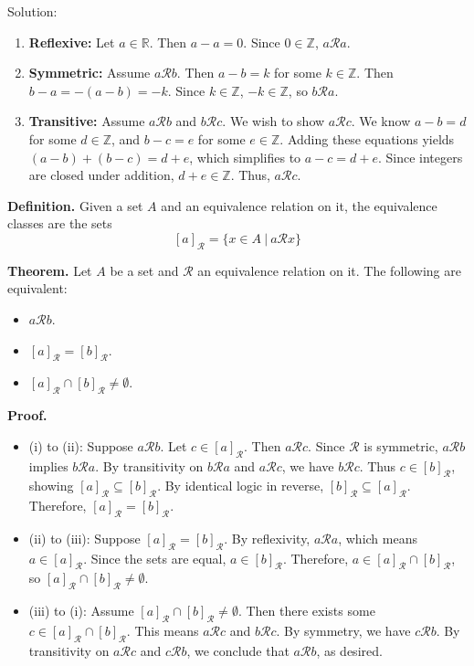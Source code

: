 \documentclass{article}
\begin{document}
    \vspace{1.5mm}
    Solution:
    \begin{enumerate}
        \item \textbf{Reflexive:} Let $a \in \mathbb{R}$. Then $a - a = 0$. Since $0 \in \mathbb{Z}$, $a \mathcal{R} a$.
    \item \textbf{Symmetric:} Assume $a \mathcal{R} b$. Then $a - b = k$ for some $k \in \mathbb{Z}$. Then $b - a = -(a - b) = -k$. Since $k \in \mathbb{Z}$, $-k \in \mathbb{Z}$, so $b \mathcal{R} a$.
    \item \textbf{Transitive:} Assume $a \mathcal{R} b$ and $b \mathcal{R} c$. We wish to show $a \mathcal{R} c$. We know $a - b = d$ for some $d \in \mathbb{Z}$, and $b - c = e$ for some $e \in \mathbb{Z}$. Adding these equations yields $(a - b) + (b - c) = d + e$, which simplifies to $a - c = d + e$. Since integers are closed under addition, $d + e \in \mathbb{Z}$. Thus, $a \mathcal{R} c$.
    \end{enumerate}
    
    \textbf{Definition.} Given a set $A$ and an equivalence relation on it, the equivalence classes are the sets
    $$[a]_{\mathcal{R}}=\{x\in A~|~a\mathcal{R} x\}$$
    
    \textbf{Theorem.} Let $A$ be a set and $\mathcal{R}$ an equivalence relation on it. The following are equivalent:
    \begin{itemize}
        \item[(i)] $a\mathcal{R}b$.
        \item[(ii)] $[a]_{\mathcal{R}}=[b]_{\mathcal{R}}$.
        \item[(iii)] $[a]_{\mathcal{R}}\cap [b]_{\mathcal{R}}\neq \emptyset$.
    \end{itemize}
    
    \textbf{Proof.} 
    \begin{itemize}
        \item (i) to (ii): Suppose $a \mathcal{R} b$. Let $c \in [a]_{\mathcal{R}}$. Then $a \mathcal{R} c$. Since $\mathcal{R}$ is symmetric, $a \mathcal{R} b$ implies $b \mathcal{R} a$. By transitivity on $b \mathcal{R} a$ and $a \mathcal{R} c$, we have $b \mathcal{R} c$. Thus $c \in [b]_{\mathcal{R}}$, showing $[a]_{\mathcal{R}} \subseteq [b]_{\mathcal{R}}$. By identical logic in reverse, $[b]_{\mathcal{R}} \subseteq [a]_{\mathcal{R}}$. Therefore, $[a]_{\mathcal{R}} = [b]_{\mathcal{R}}$.
        \item (ii) to (iii): Suppose $[a]_{\mathcal{R}}=[b]_{\mathcal{R}}$. By reflexivity, $a \mathcal{R} a$, which means $a \in [a]_{\mathcal{R}}$. Since the sets are equal, $a \in [b]_{\mathcal{R}}$. Therefore, $a \in [a]_{\mathcal{R}}\cap [b]_{\mathcal{R}}$, so $[a]_{\mathcal{R}}\cap [b]_{\mathcal{R}}\neq \emptyset$.
        \item (iii) to (i): Assume $[a]_{\mathcal{R}} \cap [b]_{\mathcal{R}} \ne \emptyset$. Then there exists some $c \in [a]_{\mathcal{R}} \cap [b]_{\mathcal{R}}$. This means $a \mathcal{R} c$ and $b \mathcal{R} c$. By symmetry, we have $c \mathcal{R} b$. By transitivity on $a \mathcal{R} c$ and $c \mathcal{R} b$, we conclude that $a \mathcal{R} b$, as desired.
    \end{itemize}
    
\end{document}
